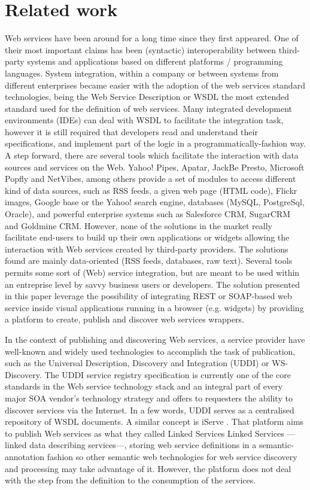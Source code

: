 
\section{Related work}
\label{sec:related_work}

Web services have been around for a long time since they first appeared. One of their most important claims has been (syntactic) interoperability between third-party systems and applications based on different platforms / programming languages. System integration, within a company or between systems from different enterprises became easier with the adoption of the web services standard technologies, being the Web Service Description or WSDL the most extended standard used for the definition of web services. Many integrated development environments (IDEs) can deal with WSDL to facilitate the integration task, however it is still required that developers read and understand their specifications, and implement part of the logic in a programmatically-fashion way. A step forward, there are several tools which facilitate the interaction with data sources and services on the Web. Yahoo! Pipes, Apatar, JackBe Presto, Microsoft Popfly and NetVibes, among others provide a set of modules to access different kind of data sources, such as RSS feeds, a given web page (HTML code), Flickr images, Google base or the Yahoo! search engine, databases (MySQL, PostgreSql, Oracle), and powerful enterprise systems such as Salesforce CRM, SugarCRM and Goldmine CRM. However, none of the solutions in the market really facilitate end-users to build up their own applications or widgets allowing the interaction with Web services created by third-party providers. The solutions found are mainly data-oriented (RSS feeds, databases, raw text). Several tools permits some sort of (Web) service integration, but are meant to be used within an entreprise level by savvy business users or developers. The solution presented in this paper leverage the possibility of integrating REST or SOAP-based web service inside visual applications running in a browser (e.g. widgets) by providing a platform to create, publish and discover web services wrappers.

In the context of publishing and discovering Web services, a service provider have well-known and widely used technologies to accomplish the task of publication, such as the Universal Description, Discovery and Integration (UDDI) or WS-Discovery. The UDDI service registry specification \cite{uddi2004} is currently one of the core standards in the Web service technology stack and an integral part of every major SOA vendor's technology strategy and offers to requesters the ability to discover services via the Internet. In a few words, UDDI serves as a centralised repository of WSDL documents. A similar concept is iServe \cite{pedrinaci_ores2010}. That platform aims to publish Web services as what they called Linked Services Linked Services ---linked data describing services---, storing web service definitions in a semantic-annotation fashion so other semantic web technologies for web service discovery and processing may take advantage of it. However, the platform does not deal with the step from the definition to the consumption of the services.

